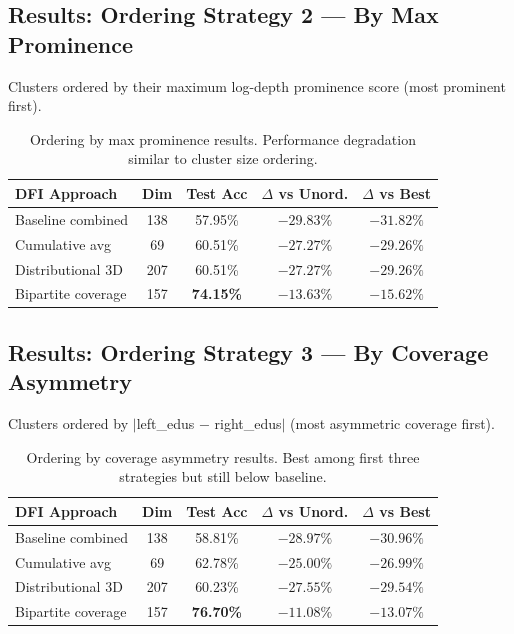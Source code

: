 \documentclass[12pt,a4paper]{article}
\begin{document}
\subsection{Results: Ordering Strategy 2 --- By Max Prominence}

Clusters ordered by their maximum log-depth prominence score (most prominent first).

\begin{table}[h]
\centering
\small
\begin{tabular}{lcccc}
\hline
\textbf{DFI Approach} & \textbf{Dim} & \textbf{Test Acc} & \textbf{$\Delta$ vs Unord.} & \textbf{$\Delta$ vs Best} \\
\hline
Baseline combined & 138 & 57.95\% & $-29.83\%$ & $-31.82\%$ \\
Cumulative avg & 69 & 60.51\% & $-27.27\%$ & $-29.26\%$ \\
Distributional 3D & 207 & 60.51\% & $-27.27\%$ & $-29.26\%$ \\
Bipartite coverage & 157 & \textbf{74.15\%} & $-13.63\%$ & $-15.62\%$ \\
\hline
\end{tabular}
\caption{Ordering by max prominence results. Performance degradation similar to cluster size ordering.}
\label{tab:ordering_prominence}
\end{table}

\subsection{Results: Ordering Strategy 3 --- By Coverage Asymmetry}

Clusters ordered by $|$left\_edus $-$ right\_edus$|$ (most asymmetric coverage first).

\begin{table}[h]
\centering
\small
\begin{tabular}{lcccc}
\hline
\textbf{DFI Approach} & \textbf{Dim} & \textbf{Test Acc} & \textbf{$\Delta$ vs Unord.} & \textbf{$\Delta$ vs Best} \\
\hline
Baseline combined & 138 & 58.81\% & $-28.97\%$ & $-30.96\%$ \\
Cumulative avg & 69 & 62.78\% & $-25.00\%$ & $-26.99\%$ \\
Distributional 3D & 207 & 60.23\% & $-27.55\%$ & $-29.54\%$ \\
Bipartite coverage & 157 & \textbf{76.70\%} & $-11.08\%$ & $-13.07\%$ \\
\hline
\end{tabular}
\caption{Ordering by coverage asymmetry results. Best among first three strategies but still below baseline.}
\label{tab:ordering_asymmetry}
\end{table}
\end{document}
